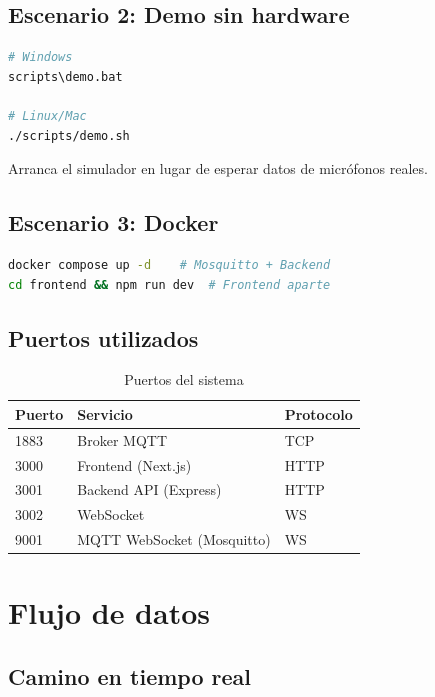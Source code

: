 \documentclass[12pt,a4paper]{report}
\begin{document}
\section{Escenario 2: Demo sin hardware}

\begin{lstlisting}[language=bash]
# Windows
scripts\demo.bat

# Linux/Mac
./scripts/demo.sh
\end{lstlisting}

Arranca el simulador en lugar de esperar datos de micr\'ofonos reales.

\section{Escenario 3: Docker}

\begin{lstlisting}[language=bash]
docker compose up -d    # Mosquitto + Backend
cd frontend && npm run dev  # Frontend aparte
\end{lstlisting}

\section{Puertos utilizados}

\begin{table}[H]
\centering
\begin{tabular}{lll}
\toprule
\textbf{Puerto} & \textbf{Servicio} & \textbf{Protocolo} \\
\midrule
1883 & Broker MQTT & TCP \\
3000 & Frontend (Next.js) & HTTP \\
3001 & Backend API (Express) & HTTP \\
3002 & WebSocket & WS \\
9001 & MQTT WebSocket (Mosquitto) & WS \\
\bottomrule
\end{tabular}
\caption{Puertos del sistema}
\end{table}

\chapter{Flujo de datos}

\section{Camino en tiempo real}
\end{document}
